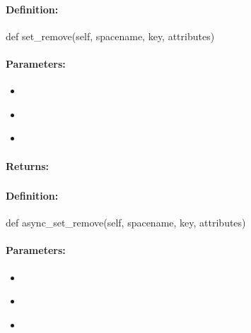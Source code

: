 \paragraph{Definition:}
\begin{pythoncode}
def set_remove(self, spacename, key, attributes)
\end{pythoncode}

\paragraph{Parameters:}
\begin{itemize}[noitemsep]
\item {}\\

\item {}\\

\item {}\\

\end{itemize}

\paragraph{Returns:}


\pagebreak
\subsubsection{}
\label{api:python:async_set_remove}


\paragraph{Definition:}
\begin{pythoncode}
def async_set_remove(self, spacename, key, attributes)
\end{pythoncode}

\paragraph{Parameters:}
\begin{itemize}[noitemsep]
\item {}\\

\item {}\\

\item {}\\

\end{itemize}

